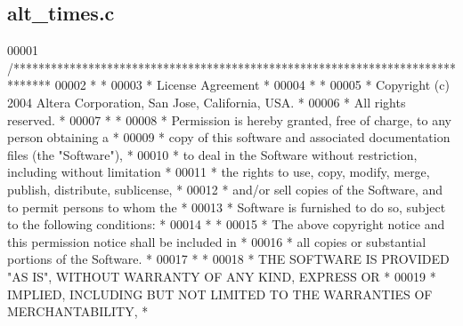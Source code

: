 \subsection{alt\+\_\+times.\+c}
\label{alt__times_8c_source}

\begin{DoxyCode}
00001 \textcolor{comment}{/******************************************************************************}
00002 \textcolor{comment}{*                                                                             *}
00003 \textcolor{comment}{* License Agreement                                                           *}
00004 \textcolor{comment}{*                                                                             *}
00005 \textcolor{comment}{* Copyright (c) 2004 Altera Corporation, San Jose, California, USA.           *}
00006 \textcolor{comment}{* All rights reserved.                                                        *}
00007 \textcolor{comment}{*                                                                             *}
00008 \textcolor{comment}{* Permission is hereby granted, free of charge, to any person obtaining a     *}
00009 \textcolor{comment}{* copy of this software and associated documentation files (the "Software"),  *}
00010 \textcolor{comment}{* to deal in the Software without restriction, including without limitation   *}
00011 \textcolor{comment}{* the rights to use, copy, modify, merge, publish, distribute, sublicense,    *}
00012 \textcolor{comment}{* and/or sell copies of the Software, and to permit persons to whom the       *}
00013 \textcolor{comment}{* Software is furnished to do so, subject to the following conditions:        *}
00014 \textcolor{comment}{*                                                                             *}
00015 \textcolor{comment}{* The above copyright notice and this permission notice shall be included in  *}
00016 \textcolor{comment}{* all copies or substantial portions of the Software.                         *}
00017 \textcolor{comment}{*                                                                             *}
00018 \textcolor{comment}{* THE SOFTWARE IS PROVIDED "AS IS", WITHOUT WARRANTY OF ANY KIND, EXPRESS OR  *}
00019 \textcolor{comment}{* IMPLIED, INCLUDING BUT NOT LIMITED TO THE WARRANTIES OF MERCHANTABILITY,    *}

\end{DoxyCode}
